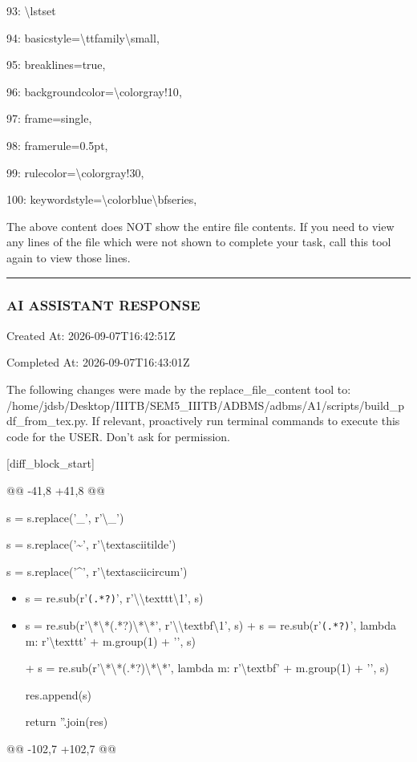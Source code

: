 \documentclass[11pt,a4paper]{article}
\begin{document}
93: \textbackslash{}lstset{

94:     basicstyle=\textbackslash{}ttfamily\textbackslash{}small,

95:     breaklines=true,

96:     backgroundcolor=\textbackslash{}color{gray!10},

97:     frame=single,

98:     framerule=0.5pt,

99:     rulecolor=\textbackslash{}color{gray!30},

100:     keywordstyle=\textbackslash{}color{blue}\textbackslash{}bfseries,

The above content does NOT show the entire file contents. If you need to view any lines of the file which were not shown to complete your task, call this tool again to view those lines.


\hrule

\subsubsection{AI ASSISTANT RESPONSE}

Created At: 2026-09-07T16:42:51Z

Completed At: 2026-09-07T16:43:01Z

The following changes were made by the replace\_file\_content tool to: /home/jdsb/Desktop/IIITB/SEM5\_IIITB/ADBMS/adbms/A1/scripts/build\_pdf\_from\_tex.py. If relevant, proactively run terminal commands to execute this code for the USER. Don't ask for permission.

[diff\_block\_start]

@@ -41,8 +41,8 @@

s = s.replace('\_', r'\textbackslash{}\_')

s = s.replace('\textasciitilde{}', r'\textbackslash{}textasciitilde{}')

s = s.replace('\textasciicircum{}', r'\textbackslash{}textasciicircum{}')

\begin{itemize}
\item            s = re.sub(r'\texttt{(.*?)}', r'\textbackslash{}\textbackslash{}texttt{\textbackslash{}1}', s)
\item            s = re.sub(r'\textbackslash{}*\textbackslash{}*(.*?)\textbackslash{}*\textbackslash{}*', r'\textbackslash{}\textbackslash{}textbf{\textbackslash{}1}', s)
+            s = re.sub(r'\texttt{(.*?)}', lambda m: r'\textbackslash{}texttt{' + m.group(1) + '}', s)

+            s = re.sub(r'\textbackslash{}*\textbackslash{}*(.*?)\textbackslash{}*\textbackslash{}*', lambda m: r'\textbackslash{}textbf{' + m.group(1) + '}', s)

res.append(s)

return ''.join(res)

\end{itemize}

@@ -102,7 +102,7 @@

}
\end{document}
